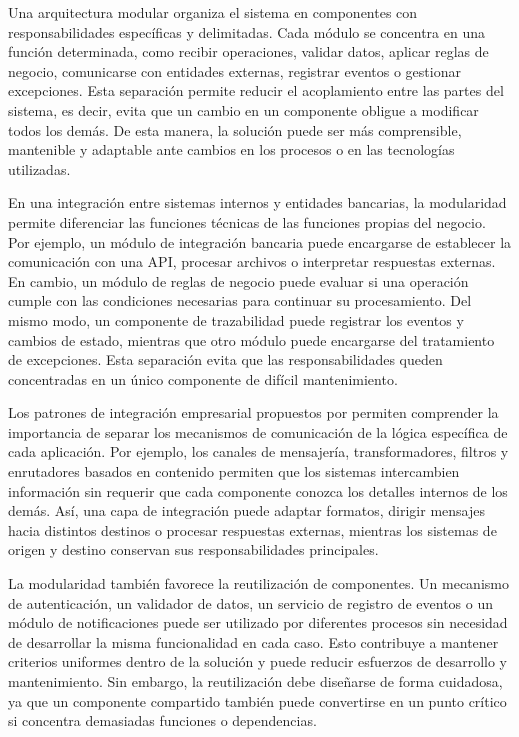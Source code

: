 Una arquitectura modular organiza el sistema en componentes con responsabilidades específicas y delimitadas. Cada módulo se concentra en una función determinada, como recibir operaciones, validar datos, aplicar reglas de negocio, comunicarse con entidades externas, registrar eventos o gestionar excepciones. Esta separación permite reducir el acoplamiento entre las partes del sistema, es decir, evita que un cambio en un componente obligue a modificar todos los demás. De esta manera, la solución puede ser más comprensible, mantenible y adaptable ante cambios en los procesos o en las tecnologías utilizadas.

En una integración entre sistemas internos y entidades bancarias, la modularidad permite diferenciar las funciones técnicas de las funciones propias del negocio. Por ejemplo, un módulo de integración bancaria puede encargarse de establecer la comunicación con una API, procesar archivos o interpretar respuestas externas. En cambio, un módulo de reglas de negocio puede evaluar si una operación cumple con las condiciones necesarias para continuar su procesamiento. Del mismo modo, un componente de trazabilidad puede registrar los eventos y cambios de estado, mientras que otro módulo puede encargarse del tratamiento de excepciones. Esta separación evita que las responsabilidades queden concentradas en un único componente de difícil mantenimiento.

Los patrones de integración empresarial propuestos por \citet{hohpe2003} permiten comprender la importancia de separar los mecanismos de comunicación de la lógica específica de cada aplicación. Por ejemplo, los canales de mensajería, transformadores, filtros y enrutadores basados en contenido permiten que los sistemas intercambien información sin requerir que cada componente conozca los detalles internos de los demás. Así, una capa de integración puede adaptar formatos, dirigir mensajes hacia distintos destinos o procesar respuestas externas, mientras los sistemas de origen y destino conservan sus responsabilidades principales.

La modularidad también favorece la reutilización de componentes. Un mecanismo de autenticación, un validador de datos, un servicio de registro de eventos o un módulo de notificaciones puede ser utilizado por diferentes procesos sin necesidad de desarrollar la misma funcionalidad en cada caso. Esto contribuye a mantener criterios uniformes dentro de la solución y puede reducir esfuerzos de desarrollo y mantenimiento. Sin embargo, la reutilización debe diseñarse de forma cuidadosa, ya que un componente compartido también puede convertirse en un punto crítico si concentra demasiadas funciones o dependencias.

